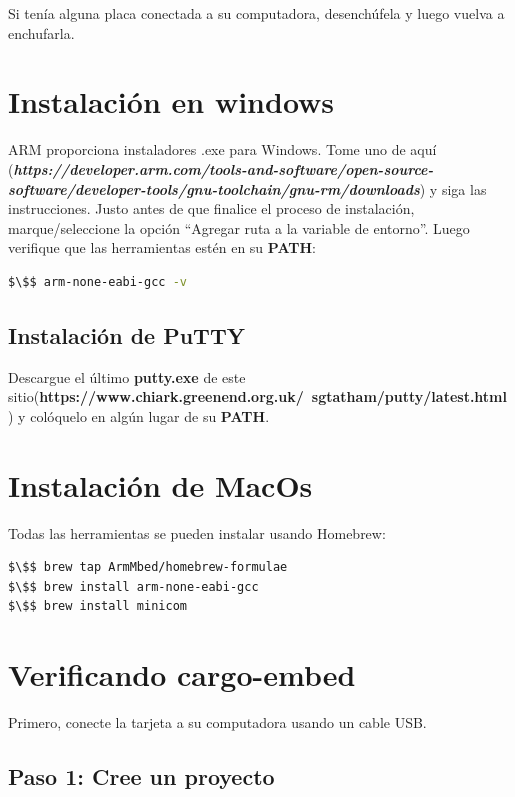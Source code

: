 Si tenía alguna placa conectada a su computadora, desenchúfela y luego vuelva a enchufarla.

\section{Instalación en windows}

ARM proporciona instaladores .exe para Windows. Tome uno de aquí (\textbf{\textit{https://developer.arm.com/tools-and-software/open-source-software/developer-tools/gnu-toolchain/gnu-rm/downloads}}) y siga las instrucciones. Justo antes de que finalice el proceso de instalación, marque/seleccione la opción ``Agregar ruta a la variable de entorno''. Luego verifique que las herramientas estén en su \textbf{PATH}:

\begin{lstlisting}[language=bash]
	$\$$ arm-none-eabi-gcc -v
\end{lstlisting} 

\subsection{Instalación de PuTTY}

Descargue el último \textbf{putty.exe} de este sitio(\textbf{https://www.chiark.greenend.org.uk/~sgtatham/putty/latest.html}) y colóquelo en algún lugar de su \textbf{PATH}.

\section{Instalación de MacOs} 

Todas las herramientas se pueden instalar usando Homebrew:

\begin{lstlisting}[language=bash]
$\$$ brew tap ArmMbed/homebrew-formulae
$\$$ brew install arm-none-eabi-gcc
$\$$ brew install minicom
\end{lstlisting} 

\section{Verificando cargo-embed}

Primero, conecte la tarjeta a su computadora usando un cable USB.

\subsection{Paso 1: Cree un proyecto}

